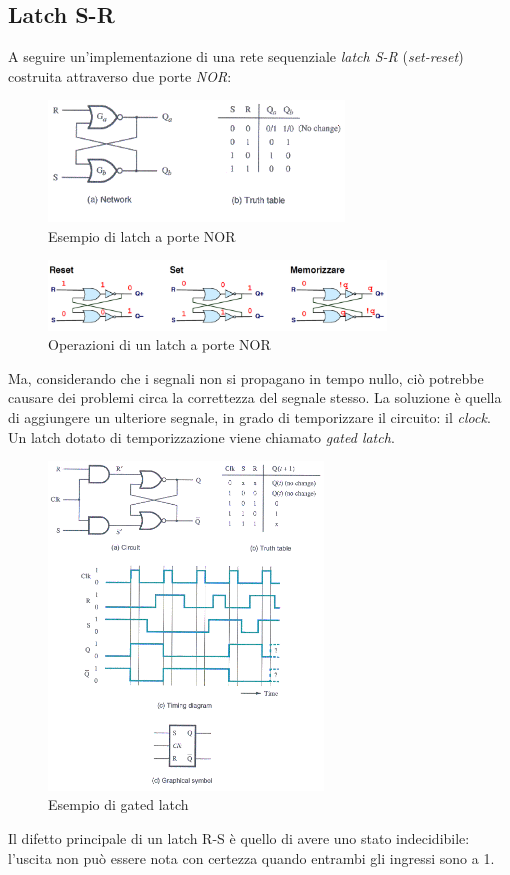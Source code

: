 \documentclass[class=book, crop=false, oneside]{standalone}
\begin{document}
\subsection*{Latch S-R}\label{subsec:latch}
A seguire un'implementazione di una rete sequenziale \emph{latch S-R} (\emph{set-reset}) costruita attraverso due porte \emph{NOR}:
\begin{figure}[H]
	\centering
	\includegraphics[width=0.7\textwidth,keepaspectratio]{es_latch.png}
	\caption{Esempio di latch a porte NOR}
\end{figure}
\begin{figure}[H]
	\centering
	\includegraphics[width=0.8\textwidth,keepaspectratio]{operazioni_latch.png}
	\caption{Operazioni di un latch a porte NOR}
\end{figure}
Ma, considerando che i segnali non si propagano in tempo nullo, ciò potrebbe causare dei problemi circa la correttezza del segnale stesso. La soluzione è quella di aggiungere un ulteriore segnale, in grado di temporizzare il circuito: il \emph{clock}. Un latch dotato di temporizzazione viene chiamato \emph{gated latch}.
\begin{figure}[H]
	\centering
	\includegraphics[width=0.65\textwidth,keepaspectratio]{gated_latch.png}
	\caption{Esempio di gated latch}
\end{figure}
Il difetto principale di un latch R-S è quello di avere uno stato indecidibile: l'uscita non può essere nota con certezza quando entrambi gli ingressi sono a 1.
\end{document}
